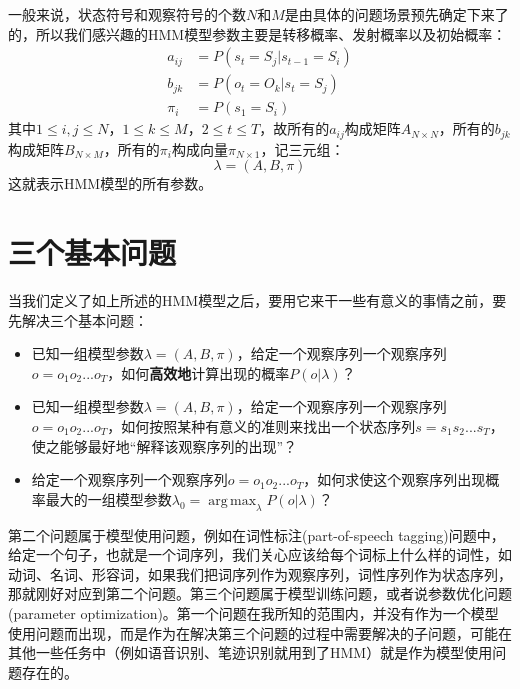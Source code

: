 \documentclass[11pt,a4paper]{article}
\DeclareMathOperator*{\argmax}{arg\,max}
\numberwithin{equation}{section}
\begin{document}
一般来说，状态符号和观察符号的个数$N$和$M$是由具体的问题场景预先确定下来了的，所以我们感兴趣的HMM模型参数主要是转移概率、发射概率以及初始概率：
\begin{subequations}
\begin{align}
a_{ij} & = P(s_t = S_j | s_{t - 1} = S_i)\\
b_{jk} & = P(o_t = O_k | s_t = S_j)\\
\pi_i & = P(s_1 = S_i)
\end{align}
\end{subequations}
其中$ 1 \le i, j \le N $，$ 1 \le k \le M $，$ 2 \le t \le T $，故所有的$ a_{ij} $构成矩阵$ A_{N \times N} $，所有的$ b_{jk} $构成矩阵$ B_{N \times M} $，所有的$ \pi_i $构成向量$ \pi_{N \times 1} $，记三元组：
\begin{equation}
\lambda = (A, B, \pi)
\end{equation}
这就表示HMM模型的所有参数。

\section{三个基本问题}

当我们定义了如上所述的HMM模型之后，要用它来干一些有意义的事情之前，要先解决三个基本问题：
\begin{itemize}
\item 已知一组模型参数$ \lambda = (A, B, \pi) $，给定一个观察序列一个观察序列$ o = o_1 o_2 ... o_T $，如何\textbf{高效地}计算出现的概率$ P(o | \lambda) $？
\item 已知一组模型参数$ \lambda = (A, B, \pi) $，给定一个观察序列一个观察序列$ o = o_1 o_2 ... o_T $，如何按照某种有意义的准则来找出一个状态序列$ s = s_1 s_2 ... s_T $，使之能够最好地“解释该观察序列的出现”？
\item 给定一个观察序列一个观察序列$ o = o_1 o_2 ... o_T $，如何求使这个观察序列出现概率最大的一组模型参数$ \lambda_0 = \argmax_{\lambda} P(o | \lambda) $？
\end{itemize}

第二个问题属于模型使用问题，例如在词性标注(part-of-speech tagging)问题中，给定一个句子，也就是一个词序列，我们关心应该给每个词标上什么样的词性，如动词、名词、形容词，如果我们把词序列作为观察序列，词性序列作为状态序列，那就刚好对应到第二个问题。第三个问题属于模型训练问题，或者说参数优化问题(parameter optimization)。第一个问题在我所知的范围内，并没有作为一个模型使用问题而出现，而是作为在解决第三个问题的过程中需要解决的子问题，可能在其他一些任务中（例如语音识别、笔迹识别就用到了HMM）就是作为模型使用问题存在的。
\end{document}
